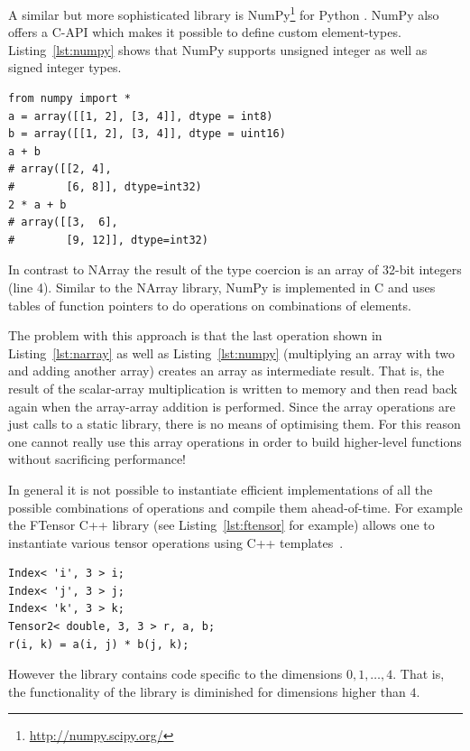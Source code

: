\documentclass[12pt,a4paper,oneside,openright]{book}
\newcommand{\Eg}{For ex\-am\-ple }
\newcommand{\Ie}{That is, }
\newcommand{\lst}[1]{Listing~\ref{lst:#1}}
\newcommand{\pythonout}{Comment lines (preceded with ``\#'') show the output of the program}
\begin{document}
\begin{CJK}{UTF8}{}
A similar but more sophisticated library is NumPy\footnote{\url{http://numpy.scipy.org/}} for Python \citep[also see][]{Oliphant2006}. NumPy also offers a C-\acs{API} which makes it possible to define custom element-types. \lst{numpy} shows that NumPy supports unsigned integer as well as signed integer types. 
\lstset{language=Python,frame=single,numbers=left}
\begin{lstlisting}[float,caption={Array operations in Python using NumPy. \pythonout},label=lst:numpy]
from numpy import *
a = array([[1, 2], [3, 4]], dtype = int8)
b = array([[1, 2], [3, 4]], dtype = uint16)
a + b
# array([[2, 4],
#        [6, 8]], dtype=int32)
2 * a + b
# array([[3,  6],
#        [9, 12]], dtype=int32)
\end{lstlisting}
In contrast to NArray the result of the type coercion is an array of 32-bit integers (line 4). Similar to the NArray library, NumPy is implemented in C and uses tables of function pointers to do operations on combinations of elements.

The problem with this approach is that the last operation shown in \lst{narray} as well as \lst{numpy} (multiplying an array with two and adding another array) creates an array as intermediate result. \Ie the result of the scalar-array multiplication is written to memory and then read back again when the array-array addition is performed. Since the array operations are just calls to a static library, there is no means of optimising them. For this reason one cannot really use this array operations in order to build higher-level functions without sacrificing performance!

In general it is not possible to instantiate efficient implementations of all the possible combinations of operations and compile them ahead-of-time. \Eg the FTensor C++ library (see \lst{ftensor} for example) allows one to instantiate various tensor operations using C++ templates~\citep{RefWorks:559}.
\lstset{language=C++,frame=single,numbers=none}
\begin{lstlisting}[float,caption={Tensor operation with the FTensor C++ library},label=lst:ftensor]
Index< 'i', 3 > i;
Index< 'j', 3 > j;
Index< 'k', 3 > k;
Tensor2< double, 3, 3 > r, a, b;
r(i, k) = a(i, j) * b(j, k);
\end{lstlisting}
However the library contains code specific to the dimensions $0,1,\ldots,4$. \Ie the functionality of the library is diminished for dimensions higher than $4$.


\end{CJK}
\end{document}
